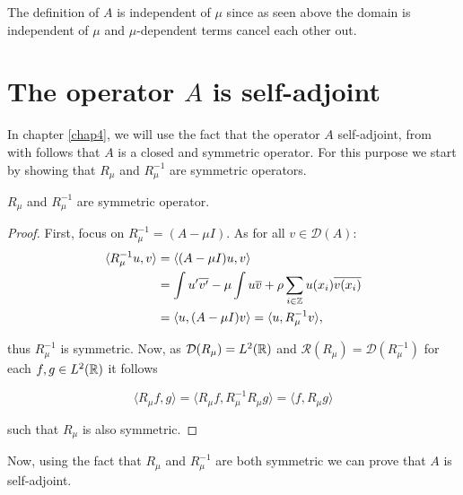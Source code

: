 \begin{remark}
	The definition of $A$ is independent of $\mu$ since as seen above the domain is independent of $\mu$ and $\mu$-dependent terms cancel each other out.
\end{remark}
 

\section{The operator $A$ is self-adjoint}

In chapter \ref{chap4}, we will use the fact that the operator $A$ self-adjoint, from with follows that $A$ is a closed and symmetric operator. For this purpose we start by showing that $R_{\mu}$ and $R_{\mu}^{-1}$ are symmetric operators.
\begin{theorem} \label{2.2:thm-RmuSymmetric}
	$R_{\mu}$ and $R_{\mu}^{-1}$ are symmetric operator.
	
	\begin{proof}
		First, focus on $R_{\mu}^{-1} = (A - \mu I)$. As for all $v \in \mathcal{D}(A)$:
			\begin{align*}
				\langle R_{\mu}^{-1} u, v \rangle & = \langle (A - \mu I) u, v \rangle \\
					& = \int u'\overline{v'} -  \mu \int u \overline{v} + \rho \sum_{i \in \mathbb{Z}} u(x_{i}) \overline{v(x_{i})} \\
					& = \langle u, (A - \mu I) v \rangle = \langle u,  R_{\mu}^{-1} v \rangle,
			\end{align*}

		thus $R_{\mu}^{-1}$ is symmetric. Now, as $\mathcal{D}(R_{\mu}) = L^{2}(\mathbb{R})$ and $\mathcal{R}(R_{\mu}) = \mathcal{D}(R_{\mu}^{-1})$ for each $f, g \in L^{2}(\mathbb{R})$ it follows
		
		\[  \langle R_{\mu} f, g \rangle =  \langle R_{\mu} f, R_{\mu}^{-1} R_{\mu} g \rangle = \langle f, R_{\mu} g \rangle \]
		
		such that $R_{\mu}$ is also symmetric.
	\end{proof}
\end{theorem}

Now, using the fact that $R_{\mu}$ and $R_{\mu}^{-1}$ are both symmetric we can  prove that $A$ is self-adjoint. 

